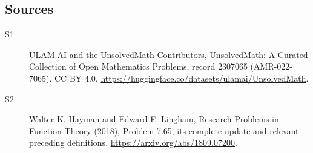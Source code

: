 \documentclass[11pt]{article}
\begin{document}
\subsection{Sources}
\begin{description}
\item[\hypertarget{source:2307065:1}{S1}] ULAM.AI and the UnsolvedMath Contributors, UnsolvedMath: A Curated Collection of Open Mathematics Problems, record 2307065 (AMR-022-7065). CC BY 4.0. \url{https://huggingface.co/datasets/ulamai/UnsolvedMath}.
\item[\hypertarget{source:2307065:2}{S2}] Walter K. Hayman and Edward F. Lingham, Research Problems in Function Theory (2018), Problem 7.65, its complete update and relevant preceding definitions. \url{https://arxiv.org/abs/1809.07200}.
\end{description}
\label{end:2307065}
\end{document}
